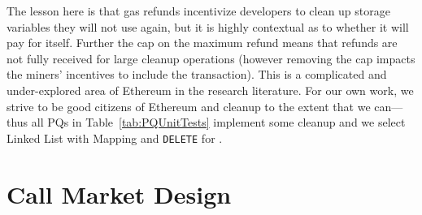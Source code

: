 The lesson here is that gas refunds incentivize developers to clean up storage variables they will not use again, but it is highly contextual as to whether it will pay for itself. Further the cap on the maximum refund means that refunds are not fully received for large cleanup operations (however removing the cap impacts the miners' incentives to include the transaction). This is a complicated and under-explored area of Ethereum in the research literature. For our own work, we strive to be good citizens of Ethereum and cleanup to the extent that we can---thus all PQs in Table~\ref{tab:PQUnitTests} implement some cleanup and we select Linked List with Mapping and \texttt{DELETE} for \cm.




\section{Call Market Design}

